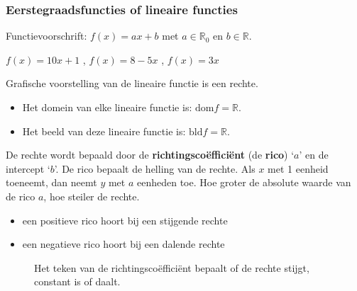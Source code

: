 \subsubsection{Eerstegraadsfuncties of lineaire functies}

\begin{definitie}
	Functievoorschrift: $f(x)=ax+b$ met $a\in\mathbb{R}_{0}$
en $b\in\mathbb{R}$.

\end{definitie}


\begin{voorbeeld}
	 $f(x)=10x+1$ , $f(x)=8-5x$ , $f(x)=3x$
\end{voorbeeld}

Grafische voorstelling van de lineaire functie is een rechte.

\begin{itemize}
	\item Het domein van elke lineaire functie is: $\textrm{dom} f = \mathbb{R}$.
	\item Het beeld van deze lineaire functie is: $\textrm{bld} f = \mathbb{R}$.
\end{itemize}

De rechte wordt bepaald door de \textbf{richtingsco\"effici\"ent}
(de \textbf{rico}) \textquoteleft $a$\textquoteright{} en de intercept
\textquoteleft $b$\textquoteright . De rico bepaalt de helling van
de rechte. Als $x$ met 1 eenheid toeneemt, dan neemt $y$ met $a$
eenheden toe. Hoe groter de absolute waarde van de rico $a$, hoe
steiler de rechte.
\begin{itemize}
\item een positieve rico hoort bij een stijgende rechte
\item een negatieve rico hoort bij een dalende rechte
\end{itemize}




\begin{figure}[H]
	\centering
	\begin{subfigure}{0.3\textwidth}
	
	\caption{}
	\label{fig:rico_pos}	
	\end{subfigure}
	\begin{subfigure}{0.3\textwidth}
	
	\caption{}
	\label{fig:rico_nul}	
	\end{subfigure}
	\begin{subfigure}{0.3\textwidth}
	
	\caption{}
	\label{fig:rico_neg}	
\end{subfigure}
\caption{Het teken van de richtingscoëfficiënt bepaalt of de rechte stijgt, constant is of daalt.}
\label{fig:rico}

\end{figure}
  


